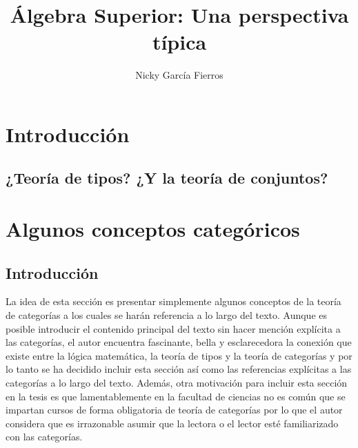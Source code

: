 \documentclass{article}
\begin{document}
\theoremstyle{definition}
\newtheorem{definition}{Definición}[section]
\newtheorem{theorem}{Teorema}[section]
\newtheorem{proposition}{Proposición}[section]
\newtheorem{corollary}{Corolario}[theorem]
\newtheorem{lemma}[theorem]{Lema}
\newtheorem{remark}{Observación}
\newtheorem*{notation}{Notación}
\newtheorem{example}{Ejemplo}[section]
\newtheorem{exercise}{Juego}[section]
\newtheorem{axiom}{Axioma}

\newcommand{\bb}[1]{\mathbb{#1}}
\newcommand{\set}[1]{\{#1\}}
\newcommand{\seq}[1]{\{#1\}_{n\in\bb{N}}}
\newcommand{\picopar}[1]{\langle #1 \rangle}
\newcommand{\card}[1]{\vert #1 \vert}
\newcommand{\RestrictTo}[1]{\restriction_{#1}}
\newcommand{\norm}[1]{\left\lVert{#1}\right\rVert}
\newcommand{\type}{\mathrm{type}}
\newcommand{\const}{\mathrm{const}}

\title{Álgebra Superior: Una perspectiva típica}
\author{Nicky García Fierros}

\maketitle
\tableofcontents

\section{Introducción}
\subsection{¿Teoría de tipos? ¿Y la teoría de conjuntos?}

\section{Algunos conceptos categóricos}
\subsection{Introducción}
La idea de esta sección es presentar simplemente algunos conceptos de la teoría
de categorías a los cuales se harán referencia a lo largo del texto. Aunque es
posible introducir el contenido principal del texto sin hacer mención explícita 
a las categorías, el autor encuentra fascinante, bella y esclarecedora la 
conexión que existe entre la lógica matemática, la teoría de tipos y la teoría 
de categorías y por lo tanto se ha decidido incluir esta sección así como las
referencias explícitas a las categorías a lo largo del texto. Además, otra
motivación para incluir esta sección en la tesis es que lamentablemente en la
facultad de ciencias no es común que se impartan cursos de forma obligatoria de
teoría de categorías por lo que el autor considera que es irrazonable asumir que
la lectora o el lector esté familiarizado con las categorías.
\end{document}

